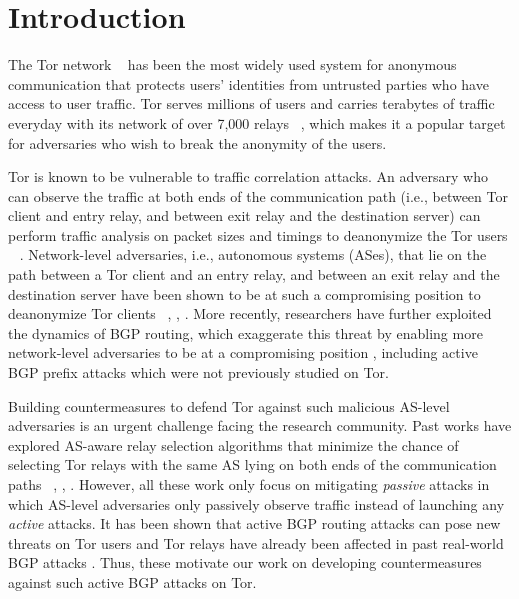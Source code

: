 \section{Introduction}

The Tor network ~\cite{dingledine2004tor} has been the most widely used system for anonymous communication that protects users' identities from untrusted parties who have access to user traffic. Tor serves millions of users and carries terabytes of traffic everyday with its network of over 7,000 relays ~\cite{tormetrics}, which makes it a popular target for adversaries who wish to break the anonymity of the users. 

Tor is known to be vulnerable to traffic correlation attacks. An adversary who can observe the traffic at both ends of the communication path (i.e., between Tor client and entry relay, and between exit relay and the destination server) can perform traffic analysis on packet sizes and timings to deanonymize the Tor users ~\cite{shmatikov2006timing} \cite{syverson2001towards}. Network-level adversaries, i.e., autonomous systems (ASes), that lie on the path between a Tor client and an entry relay, and between an exit relay and the destination server have been shown to be at such a compromising position to deanonymize Tor clients ~\cite{feamster2004location}, \cite{edman2009awareness}, \cite{johnson2013users}. More recently, researchers have further exploited the dynamics of BGP routing, which exaggerate this threat by enabling more network-level adversaries to be at a compromising position \cite{sun2015raptor}, including active BGP prefix attacks which were not previously studied on Tor. 

Building countermeasures to defend Tor against such malicious AS-level adversaries is an urgent challenge facing the research community. Past works have explored AS-aware relay selection algorithms that minimize the chance of selecting Tor relays with the same AS lying on both ends of the communication paths ~\cite{edman2009awareness}, \cite{akhoondi2012lastor}, \cite{starov2015measuring}. However, all these work only focus on mitigating \emph{passive} attacks in which AS-level adversaries only passively observe traffic instead of launching any \emph{active} attacks. It has been shown that active BGP routing attacks can pose new threats on Tor users and Tor relays have already been affected in past real-world BGP attacks \cite{sun2015raptor}. Thus, these motivate our work on developing countermeasures against such active BGP attacks on Tor. 

